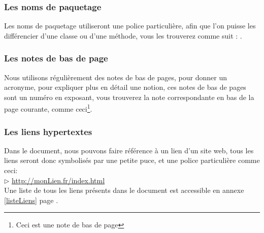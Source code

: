 \subsubsection*{Les noms de paquetage}
Les noms de paquetage utiliseront une police particulière, afin que l'on puisse les différencier d'une classe ou d'une méthode, vous les trouverez 
comme suit : .
\subsubsection*{Les notes de bas de page}
Nous utilisons régulièrement des notes de bas de pages, pour donner un acronyme, pour expliquer plus en détail une notion, ces notes de bas de pages sont un numéro
en exposant, vous trouverez la note correspondante en bas de la page courante, comme ceci\footnote{Ceci est une note de bas de page}.
\subsubsection*{Les liens hypertextes}
Dans le document, nous pouvons faire référence à un lien d'un site web, tous les liens seront donc symbolisés par une petite puce, et une police particulière comme ceci:\\
	$\rhd$ \url{http://monLien.fr/index.html}\\
	Une liste de tous les liens présents dans le document est accessible en annexe \ref{listeLiens} page \pageref{listeLiens}.

